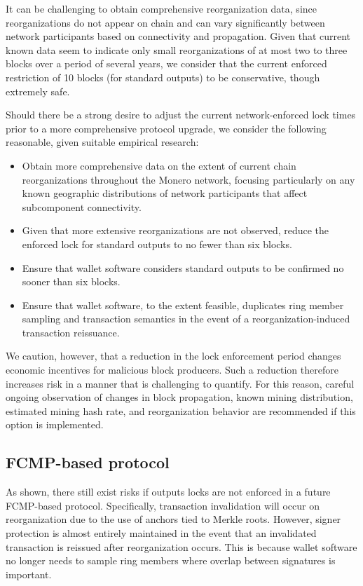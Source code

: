 \documentclass{article}
\theoremstyle{definition}
\begin{document}
It can be challenging to obtain comprehensive reorganization data, since reorganizations do not appear on chain and can vary significantly between network participants based on connectivity and propagation.
Given that current known data seem to indicate only small reorganizations of at most two to three blocks over a period of several years, we consider that the current enforced restriction of 10 blocks (for standard outputs) to be conservative, though extremely safe.

Should there be a strong desire to adjust the current network-enforced lock times prior to a more comprehensive protocol upgrade, we consider the following reasonable, given suitable empirical research:
\begin{itemize}
\item Obtain more comprehensive data on the extent of current chain reorganizations throughout the Monero network, focusing particularly on any known geographic distributions of network participants that affect subcomponent connectivity.
\item Given that more extensive reorganizations are not observed, reduce the enforced lock for standard outputs to no fewer than six blocks.
\item Ensure that wallet software considers standard outputs to be confirmed no sooner than six blocks.
\item Ensure that wallet software, to the extent feasible, duplicates ring member sampling and transaction semantics in the event of a reorganization-induced transaction reissuance.
\end{itemize}

We caution, however, that a reduction in the lock enforcement period changes economic incentives for malicious block producers.
Such a reduction therefore increases risk in a manner that is challenging to quantify.
For this reason, careful ongoing observation of changes in block propagation, known mining distribution, estimated mining hash rate, and reorganization behavior are recommended if this option is implemented. 


\subsection{FCMP-based protocol}

As shown, there still exist risks if outputs locks are not enforced in a future FCMP-based protocol.
Specifically, transaction invalidation will occur on reorganization due to the use of anchors tied to Merkle roots.
However, signer protection is almost entirely maintained in the event that an invalidated transaction is reissued after reorganization occurs.
This is because wallet software no longer needs to sample ring members where overlap between signatures is important.
\end{document}
